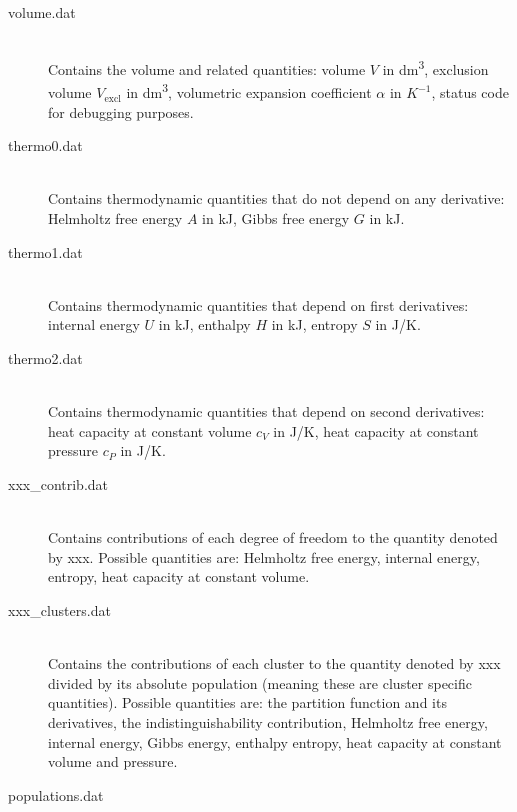 \documentclass{scrartcl}
\begin{document}
\begin{description}
    \item[volume.dat] \hfill \\
        Contains the volume and related quantities:
        volume $V$ in \si{dm^3}, exclusion volume $V_\mathrm{excl}$ in \si{dm^3}, volumetric expansion coefficient $\alpha$ in $\si{K^{-1}}$, status code for debugging purposes.
        \vspace{0.1cm}
    \item[thermo0.dat] \hfill \\
        Contains thermodynamic quantities that do not depend on any derivative:
        Helmholtz free energy $A$ in \si{kJ}, Gibbs free energy $G$ in \si{kJ}.
        \vspace{0.1cm}
    \item[thermo1.dat] \hfill \\
        Contains thermodynamic quantities that depend on first derivatives:
        internal energy $U$ in \si{kJ}, enthalpy $H$ in \si{kJ}, entropy $S$ in \si{J/K}.
        \vspace{0.1cm}
    \item[thermo2.dat] \hfill \\
        Contains thermodynamic quantities that depend on second derivatives:
        heat capacity at constant volume $c_V$ in \si{J/K}, heat capacity at constant pressure $c_P$ in \si{J/K}.
        \vspace{0.1cm}
    \item[xxx\_contrib.dat] \hfill \\
        Contains contributions of each degree of freedom to the quantity denoted by xxx.
        Possible quantities are: Helmholtz free energy, internal energy, entropy, heat capacity at constant volume.
        \vspace{0.1cm}
    \item[xxx\_clusters.dat] \hfill \\
        Contains the contributions of each cluster to the quantity denoted by xxx divided by its absolute 
        population (meaning these are cluster specific quantities).
        Possible quantities are: the partition function and its derivatives, the indistinguishability contribution, 
        Helmholtz free energy, internal energy, Gibbs energy, enthalpy entropy, heat capacity at constant volume and pressure.
        \vspace{0.1cm}
    \item[populations.dat] \hfill \\

\end{description}
\end{document}
